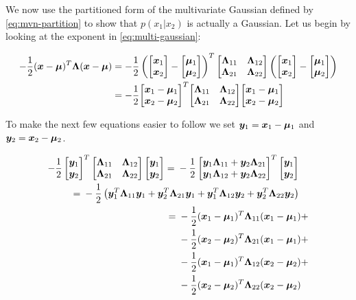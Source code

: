 We now use the partitioned form of the multivariate Gaussian defined by \eqref{eq:mvn-partition} to show that $p(x_1 | x_2)$ is actually a Gaussian. Let us begin by looking at the exponent in \eqref{eq:multi-gaussian}:

\begin{align}
-\frac{1}{2} ({\bm{x}} - {\bm{\mu}})^T {\bm{\Lambda}} ({\bm{x}} - {\bm{\mu}}) &= 
-\frac{1}{2} \left({\begin{bmatrix} {\bm{x}}_1 \\ {\bm{x}}_2 \end{bmatrix}} - {\begin{bmatrix} {\bm{\mu}}_1 \\ {\bm{\mu}}_2 \end{bmatrix}} \right)^T {\begin{bmatrix} {{\bm{\Lambda}}_{11}} & {{\bm{\Lambda}}_{12}} \\ {{\bm{\Lambda}}_{21}} & {{\bm{\Lambda}}_{22}} \end{bmatrix}} \left({\begin{bmatrix} {\bm{x}}_1 \\ {\bm{x}}_2 \end{bmatrix}} - {\begin{bmatrix} {\bm{\mu}}_1 \\ {\bm{\mu}}_2 \end{bmatrix}} \right) \\
&= -\frac{1}{2} {\begin{bmatrix} {\bm{x}}_1 - {\bm{\mu}}_1 \\ {\bm{x}}_2 - {\bm{\mu}}_2 \end{bmatrix}}^T {\begin{bmatrix} {{\bm{\Lambda}}_{11}} & {{\bm{\Lambda}}_{12}} \\ {{\bm{\Lambda}}_{21}} & {{\bm{\Lambda}}_{22}} \end{bmatrix}} {\begin{bmatrix} {\bm{x}}_1 - {\bm{\mu}}_1 \\ {\bm{x}}_2 - {\bm{\mu}}_2 \end{bmatrix}}
\end{align}

To make the next few equations easier to follow we set ${\bm{y}}_1 = {\bm{x}}_1 - {\bm{\mu}}_1$ and ${\bm{y}}_2 = {\bm{x}}_2 - {\bm{\mu}}_2$.

\begin{align}
\begin{split}
-\frac{1}{2} \begin{bmatrix} \vy_1 \\ \vy_2 \end{bmatrix} ^T \partlambda \begin{bmatrix} \vy_1 \\ \vy_2 \end{bmatrix} ={}& -\frac{1}{2} \begin{bmatrix} \vy_1 \ml{11} + \vy_2 \ml{21} \\ \vy_1 \ml{12} + \vy_2 \ml{22} \end{bmatrix} ^T \begin{bmatrix} \vy_1 \\ \vy_2 \end{bmatrix}
\end{split} \\
%
\begin{split}
={}& -\frac{1}{2} \left( \vy_1^T \ml{11} \vy_1 + \vy_2^T \ml{21} \vy_1 + \vy_1^T \ml{12} \vy_2 + \vy_2^T \ml{22} \vy_2 \right)
\end{split} \\
%
\begin{split}
={}& -\frac{1}{2} (\vx_1 - \vmu_1)^T \ml{11} (\vx_1 - \vmu_1) {}+ \\
  &-\frac{1}{2} (\vx_2 - \vmu_2)^T \ml{21} (\vx_1 - \vmu_1) {}+ \\
  &-\frac{1}{2} (\vx_1 - \vmu_1)^T \ml{12} (\vx_2 - \vmu_2) {}+ \\
  &-\frac{1}{2} (\vx_2 - \vmu_2)^T \ml{22} (\vx_2 - \vmu_2) \label{eq:mvn-quadratic-form}
\end{split}
\end{align}

